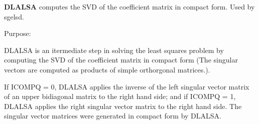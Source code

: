 {\bfseries D\+L\+A\+L\+S\+A} computes the S\+V\+D of the coefficient matrix in compact form. Used by sgelsd. 

 \begin{DoxyParagraph}{Purpose\+: }
\begin{DoxyVerb} DLALSA is an itermediate step in solving the least squares problem
 by computing the SVD of the coefficient matrix in compact form (The
 singular vectors are computed as products of simple orthorgonal
 matrices.).

 If ICOMPQ = 0, DLALSA applies the inverse of the left singular vector
 matrix of an upper bidiagonal matrix to the right hand side; and if
 ICOMPQ = 1, DLALSA applies the right singular vector matrix to the
 right hand side. The singular vector matrices were generated in
 compact form by DLALSA.\end{DoxyVerb}
 
\end{DoxyParagraph}

